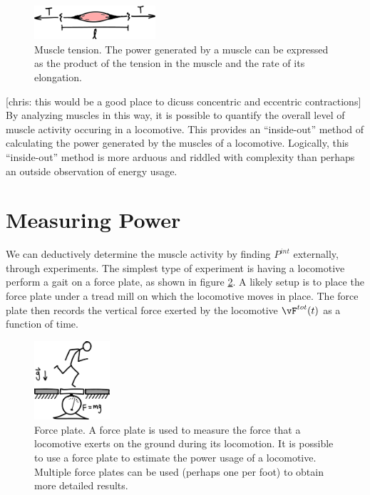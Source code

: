 \begin{figure}[h]		%
\begin{centering}
\includegraphics[width=0.4\textwidth]{Figures/OneMuscle}\par
\end{centering}
\caption[Diagram: Muscle tension]{Muscle tension. The power generated by a muscle can be expressed as the product of the tension in the muscle and the rate of its elongation.}
\label{fig:OneMuscle}
\end{figure}
%
[chris: this would be a good place to dicuss concentric and eccentric contractions]
By analyzing muscles in this way, it is possible to quantify the overall level of muscle activity occuring in a locomotive. This provides an ``inside-out'' method of calculating the power generated by the muscles of a locomotive. Logically, this ``inside-out'' method is more arduous and riddled with complexity than perhaps an outside observation of energy usage.

\section{Measuring Power}
\label{sec:MeasuringPower}

We can deductively determine the muscle activity by finding $P^{int}$ externally, through experiments. The simplest type of experiment is having a locomotive perform a gait on a force plate, as shown in figure \ref{fig:ForcePlate}. A likely setup is to place the force plate under a tread mill on which the locomotive moves in place. The force plate then records the vertical force exerted by the locomotive $\vF^{tot}(t)$ as a function of time.

\begin{figure}[h]		%
\begin{centering}
\includegraphics[width=0.25\textwidth]{Figures/ForcePlate}\par
\end{centering}
\caption[Diagram: Force Plate]{Force plate. A force plate is used to measure the force that a locomotive exerts on the ground during its locomotion. It is possible to use a force plate to estimate the power usage of a locomotive. Multiple force plates can be used (perhaps one per foot) to obtain more detailed results.}
\label{fig:ForcePlate}
\end{figure}
%

